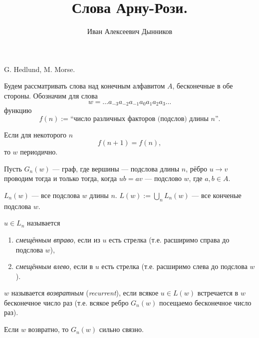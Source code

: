 \documentclass[12pt,a4paper]{article}
\title{Слова Арну-Рози.}
\author{Иван Алексеевич Дынников}
\begin{document}
    \maketitle

    G. Hedlund, M. Morse.

    \begin{definition}
        Будем рассматривать слова над конечным алфавитом $A$, бесконечные в обе стороны. Обозначим для слова
        \[w = \dots a_{-3} a_{-2} a_{-1} a_0 a_1 a_2 a_3 \dots\]
        функцию
        \[f(n) := \text{``число различных факторов (подслов) длины $n$''}.\]
    \end{definition}

    \begin{theorem}
        Если для некоторого $n$
        \[f(n+1) = f(n),\]
        то $w$ периодично.
    \end{theorem}

    \begin{definition}
        Пусть $G_n(w)$ --- граф, где вершины --- подслова длины $n$, рёбро $u \to v$ проводим тогда и только тогда, когда $ub = av$ --- подслово $w$, где $a, b \in A$.
    \end{definition}

    \begin{definition}
        $L_n(w)$ --- все подслова $w$ длины $n$. $L(w) := \bigcup_{n} L_n(w)$ --- все конченые подслова $w$.
    \end{definition}

    \begin{definition}
        $u \in L_n$ называется
        \begin{enumerate}
            \item \emph{смещённым вправо}, если из $u$ есть стрелка (т.е. расширимо справа до подслова $w$),
            \item \emph{смещённым влево}, если в $u$ есть стрелка (т.е. расширимо слева до подслова $w$).
        \end{enumerate}
    \end{definition}

    \begin{definition}
        $w$ называется \emph{возвратным} (\emph{recurrent}), если всякое $u \in L(w)$ встречается в $w$ бесконечное число раз (т.е. всякое ребро $G_n(w)$ посещаемо бесконечное число раз).
    \end{definition}

    \begin{remark}
        Если $w$ возвратно, то $G_n(w)$ сильно связно.
    \end{remark}
\end{document}
